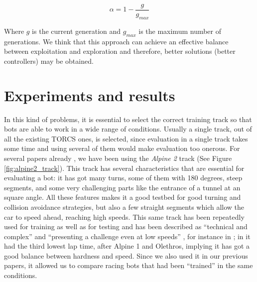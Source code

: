 \documentclass[10pt,journal,compsoc]{IEEEtran}
\begin{document}
 \begin{equation}
 	\label{eqalpha}
 	\alpha =1-\frac{g}{g_{max}}
 \end{equation}

Where $g$ is the current generation and $g_{max}$ is the maximum number of generations. We think that this approach can achieve an effective balance between exploitation and exploration and therefore, better solutions (better controllers) may be obtained.



\section{Experiments and results}  
\label{sec:results}


In this kind of problems, it is essential to select the correct
training track so that bots are able to work in a wide range of
conditions. Usually a single track, out of all the existing TORCS
ones, is selected, since evaluation in a single track takes some time
and using several of them would make evaluation too onerous. For
several papers already \cite{salem_cig2018,DBLP:conf/cig/SalemMG19},
we have been using the \textit{Alpine 2} track (See Figure
\ref{fig:alpine2_track}). This track has several characteristics that
are essential for evaluating a bot: it has got many turns, some of
them with 180 degrees, steep segments, and some very challenging parts
like the entrance of a tunnel at an square angle. All these features makes
it a good testbed for good turning and collision avoidance
strategies, but also a few straight segments which allow the car to
speed ahead, reaching high speeds. This same track has been repeatedly
used for training as well as for testing and has been described as
``technical and complex'' \cite{AG} and ``presenting a challenge even
at low speeds'' \cite{vrajitoru2018global}, for instance in
\cite{cardamone2010applying,CarRacing_Pelta09,zong2017obstacle}; in \cite{AG} it had the third lowest lap time, after Alpine 1 and Olethros, implying it
has got a good balance between hardness and speed. Since we also used
it in our previous papers, it allowed us to compare racing bots that
had been ``trained'' in the same conditions.
\end{document}
